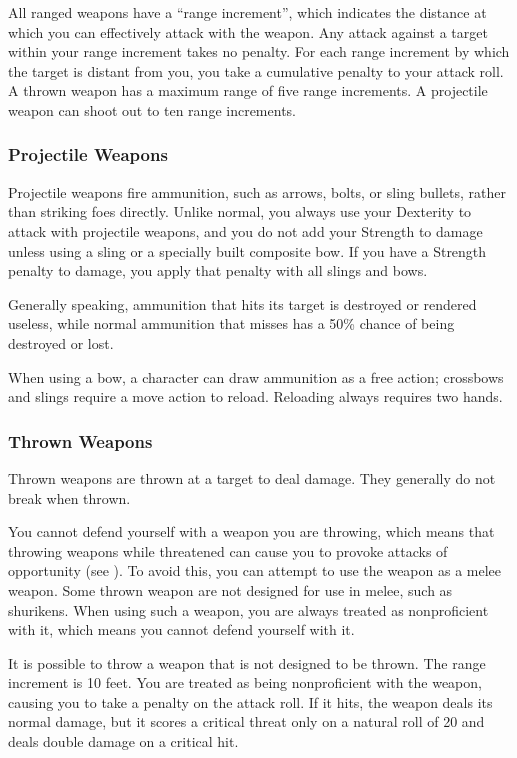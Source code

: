  All ranged weapons have a ``range increment'', which indicates the distance at which you can effectively attack with the weapon. Any attack against a target within your range increment takes no penalty. For each range increment by which the target is distant from you, you take a cumulative  penalty to your attack roll. A thrown weapon has a maximum range of five range increments. A projectile weapon can shoot out to ten range increments.

\subsubsection{Projectile Weapons} Projectile weapons fire ammunition, such as arrows, bolts, or sling bullets, rather than striking foes directly. Unlike normal, you always use your Dexterity to attack with projectile weapons, and you do not add your Strength to damage unless using a sling or a specially built composite bow. If you have a Strength penalty to damage, you apply that penalty with all slings and bows.

 Generally speaking, ammunition that hits its target is destroyed or rendered useless, while normal ammunition that misses has a 50\% chance of being destroyed or lost.

 When using a bow, a character can draw ammunition as a free action; crossbows and slings require a move action to reload. Reloading always requires two hands.

\subsubsection{Thrown Weapons} Thrown weapons are thrown at a target to deal damage. They generally do not break when thrown.

\label{Thrown Weapons in Melee} You cannot defend yourself with a weapon you are throwing, which means that throwing weapons while threatened can cause you to provoke attacks of opportunity (see ). To avoid this, you can attempt to use the weapon as a melee weapon. Some thrown weapon are not designed for use in melee, such as shurikens. When using such a weapon, you are always treated as nonproficient with it, which means you cannot defend yourself with it.

 It is possible to throw a weapon that is not designed to be thrown. The range increment is 10 feet. You are treated as being nonproficient with the weapon, causing you to take a  penalty on the attack roll. If it hits, the weapon deals its normal damage, but it scores a critical threat only on a natural roll of 20 and deals double damage on a critical hit.

